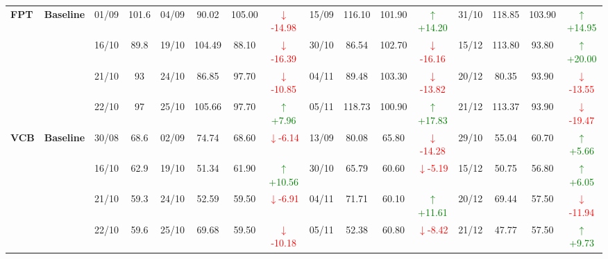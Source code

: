 \documentclass{ieeeaccess}
\begin{document}
{\begin{longtable}{llcc|cccc|cccc|cccc}
\multirow{4}{*}{\textbf{FPT}}
& \textbf{Baseline}
& 01/09 & 101.6 & 04/09 & 90.02 & 105.00 & \textcolor{red}{\(\downarrow\)-14.98} & 15/09 & 116.10 & 101.90 & \textcolor{green}{\(\uparrow\)+14.20} & 31/10 & 118.85 & 103.90 & \textcolor{green}{\(\uparrow\)+14.95} \\
& & 16/10 & 89.8 & 19/10 & 104.49 & 88.10 & \textcolor{red}{\(\downarrow\)-16.39} & 30/10 & 86.54 & 102.70 & \textcolor{red}{\(\downarrow\)-16.16} & 15/12 & 113.80 & 93.80 & \textcolor{green}{\(\uparrow\)+20.00} \\
& & 21/10 & 93 & 24/10 & 86.85 & 97.70 & \textcolor{red}{\(\downarrow\)-10.85} & 04/11 & 89.48 & 103.30 & \textcolor{red}{\(\downarrow\)-13.82} & 20/12 & 80.35 & 93.90 & \textcolor{red}{\(\downarrow\)-13.55} \\
& & 22/10 & 97 & 25/10 & 105.66 & 97.70 & \textcolor{green}{\(\uparrow\)+7.96} & 05/11 & 118.73 & 100.90 & \textcolor{green}{\(\uparrow\)+17.83} & 21/12 & 113.37 & 93.90 & \textcolor{red}{\(\downarrow\)-19.47} \\
\midrule

\multirow{4}{*}{\textbf{VCB}}
& \textbf{Baseline}
& 30/08 & 68.6 & 02/09 & 74.74 & 68.60 & \textcolor{red}{\(\downarrow\)-6.14} & 13/09 & 80.08 & 65.80 & \textcolor{red}{\(\downarrow\)-14.28} & 29/10 & 55.04 & 60.70 & \textcolor{green}{\(\uparrow\)+5.66} \\
& & 16/10 & 62.9 & 19/10 & 51.34 & 61.90 & \textcolor{green}{\(\uparrow\)+10.56} & 30/10 & 65.79 & 60.60 & \textcolor{red}{\(\downarrow\)-5.19} & 15/12 & 50.75 & 56.80 & \textcolor{green}{\(\uparrow\)+6.05} \\
& & 21/10 & 59.3 & 24/10 & 52.59 & 59.50 & \textcolor{red}{\(\downarrow\)-6.91} & 04/11 & 71.71 & 60.10 & \textcolor{green}{\(\uparrow\)+11.61} & 20/12 & 69.44 & 57.50 & \textcolor{red}{\(\downarrow\)-11.94} \\
& & 22/10 & 59.6 & 25/10 & 69.68 & 59.50 & \textcolor{red}{\(\downarrow\)-10.18} & 05/11 & 52.38 & 60.80 & \textcolor{red}{\(\downarrow\)-8.42} & 21/12 & 47.77 & 57.50 & \textcolor{green}{\(\uparrow\)+9.73} \\
\midrule


\end{longtable}}
\end{document}
